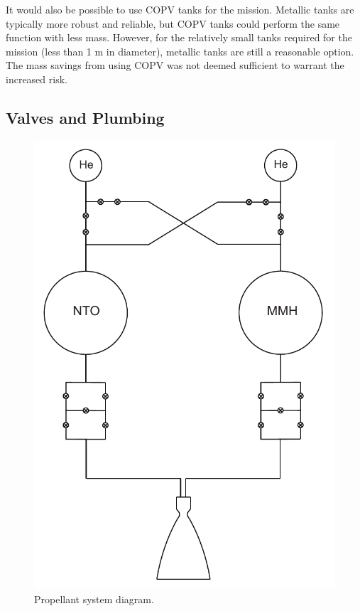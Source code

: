 \documentclass[paper=letter, fontsize=11pt]{scrartcl} %
\numberwithin{equation}{section} %
\numberwithin{figure}{section} %
\numberwithin{table}{section} %
\begin{document}
It would also be possible to use COPV tanks for the mission. Metallic tanks are typically more robust and reliable, but COPV tanks could perform the same function with less mass. However, for the relatively small tanks required for the mission (less than 1 m in diameter), metallic tanks are still a reasonable option. The mass savings from using COPV was not deemed sufficient to warrant the increased risk.

\subsection{Valves and Plumbing}

\begin{figure}[H]
	\begin{center}
	\includegraphics[height=.4\textheight]{propellant_system_diagram.pdf}
	\caption{Propellant system diagram.}
	\end{center}
\end{figure}
\end{document}
